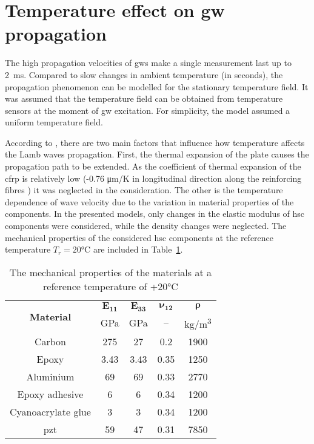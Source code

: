 \section{Temperature effect on \acl{gw} propagation}
\label{sec:temp}
 
The high propagation velocities of \acp{gw} make a single measurement last up to 2~\unit{\milli\second}.
Compared to slow changes in ambient temperature (in seconds), the propagation phenomenon can be modelled for the stationary temperature field.
It was assumed that the temperature field can be obtained from temperature sensors at the moment of \ac{gw} excitation.
For simplicity, the model assumed a uniform temperature field.

According to \cite{lu2005methodology, kijanka2013gpu}, there are two main factors that influence how temperature affects the Lamb waves propagation. First, the thermal expansion of the plate causes the propagation path to be extended. As the coefficient of thermal expansion of the \ac{cfrp} is relatively low (-0.76 \unit[per-mode = symbol]{\micro\meter\per\kelvin} in longitudinal direction along the reinforcing fibres \cite{ahmed2012study}) it was neglected in the consideration.
The other is the temperature dependence of wave velocity due to the variation in material properties of the components.
In the presented models, only changes in the elastic modulus of \ac{hsc} components were considered, while the density changes were neglected.
The mechanical properties of the considered \ac{hsc} components at the reference temperature \(T_r=20\)\unit{\degreeCelsius} are included in Table~\ref{tab:properties}.
\begin{table}[H]
	\small
	\tabcolsep=0.5cm
	\centering
	\caption{\label{tab:properties}The mechanical properties of the materials at a reference temperature of +20\unit{\degreeCelsius}}
	\begin{tabular}{ccccc}\toprule
		\multirow{2}{*}{\textbf{Material}} & $\boldsymbol{E_{11}}$ & $\boldsymbol{E_{33}}$ & $\boldsymbol{\nu_{12}}$ & $\boldsymbol{\rho}$ \\ & \unit{\giga\pascal} & \unit{\giga\pascal} & -- & \unit[per-mode = symbol]{\kilogram\per\cubic\meter}\\
		\midrule
		Carbon & 275 & 27 & 0.2 & 1900\\
		Epoxy & 3.43 & 3.43 & 0.35 & 1250\\
		Aluminium & 69 & 69 & 0.33 & 2770\\
		Epoxy adhesive & 6 & 6 & 0.34 & 1200\\
		Cyanoacrylate glue & 3 & 3 & 0.34 & 1200\\	
		\ac{pzt} &  59 & 47 & 0.31 & 7850\\
		\bottomrule
	\end{tabular}
\end{table}
